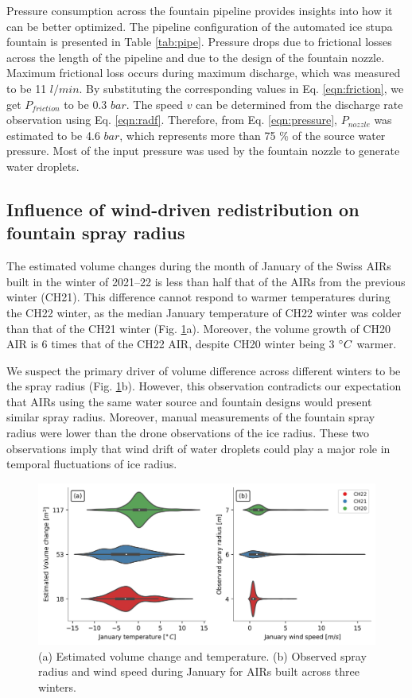 \documentclass[tc, manuscript]{copernicus}
\begin{document}
Pressure consumption across the fountain pipeline provides insights into how it can be better optimized. The
pipeline configuration of the automated ice stupa fountain is presented in Table \ref{tab:pipe}. Pressure drops
due to frictional losses across the length of the pipeline and due to the design of the fountain nozzle. Maximum
frictional loss occurs during maximum discharge, which was measured to be 11 $l/min$. By substituting the
corresponding values in Eq. \ref{eqn:friction}, we get $P_{friction}$ to be 0.3 $bar$. The speed $v$ can be
determined from the discharge rate observation using Eq. \ref{eqn:radf}. Therefore, from Eq. \ref{eqn:pressure},
$P_{nozzle}$ was estimated to be 4.6 $bar$, which represents more than 75 \% of the source water pressure. Most
of the input pressure was used by the fountain nozzle to generate water droplets.


\subsection{Influence of wind-driven redistribution on fountain spray radius}

The estimated volume changes during the month of January of the Swiss AIRs built in the winter of 2021--22 is less
than half that of the AIRs from the previous winter (CH21). This difference cannot respond to warmer
temperatures during the CH22 winter, as the median January temperature of CH22 winter was colder than that of the
CH21 winter (Fig. \ref{fig:CH_diffs}a). Moreover, the volume growth of CH20 AIR is 6 times that of the CH22 AIR,
despite CH20 winter being 3 $^{\circ} C$ warmer.

We suspect the primary driver of volume difference across different winters to be the spray radius (Fig.
\ref{fig:CH_diffs}b). However, this observation contradicts our expectation that AIRs using the same water
source and fountain designs would present similar spray radius. Moreover, manual measurements of the fountain
spray radius were lower than the drone observations of the ice radius. These two observations imply that wind
drift of water droplets could play a major role in temporal fluctuations of ice radius.

\begin{figure}[htb]
\includegraphics[width=\textwidth]{Figures/CH_diffs.jpg}

\caption{(a) Estimated volume change and temperature. (b) Observed spray radius and wind speed
during January for AIRs built across three winters. } 

\label{fig:CH_diffs} 
\end{figure}
\end{document}
